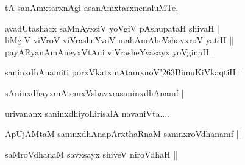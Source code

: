 \begin{entry}
\begin{shl}
tA sanAmxtarxnAgi asanAmxtarxnenaluMTe.
\end{shl}
\end{entry}

\begin{entry}
\begin{shl}
avadUtashacx saMnAyxsiV yoVgiV pAshupataH shivaH |\\
liMgiV viVroV viVrasheYvoV mahAmAheVshavxroV yatiH ||\\
payARyanAmAneyxVtAni viVrasheYvasayx yoVginaH |
\end{shl}
\end{entry}

\begin{entry}
\begin{shl}
saninxdhAnamiti porxVkatxmAtamxnoV{\char'263}BimuKiVkaqtiH |
\end{shl}
\begin{shl}
sAninxdhayxmAtemxVshavxrasaninxdhAnamf |
\end{shl}
\end{entry}

\begin{entry}
\gl{}
\begin{shl}
urivananx saninxdhiyoLirisalA navaniVta....
\end{shl}
\end{entry}

\begin{entry}
\begin{shl}
ApUjAMtaM saninxdhAnapArxthaRnaM saninxroVdhanamf ||
\end{shl}
\begin{shl}
saMroVdhanaM savxsayx shiveV niroVdhaH ||
\end{shl}
\end{entry}

